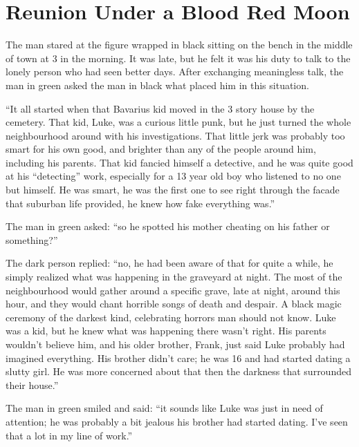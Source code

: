 \chapter{Reunion Under a Blood Red Moon}



The man stared at the figure wrapped in black sitting on the bench
in the middle of town at 3 in the morning. It was late, but he felt
it was his duty to talk to the lonely person who had seen better
days. After exchanging meaningless talk, the man in green asked the
man in black what placed him in this situation.

``It all started when that Bavarius kid moved in the 3 story
house by the cemetery. That kid, Luke, was a curious little punk,
but he just turned the whole neighbourhood around with his
investigations. That little jerk was probably too smart for his own
good, and brighter than any of the people around him, including his
parents. That kid fancied himself a detective, and he was quite
good at his ``detecting'' work, especially for a 13 year
old boy who listened to no one but himself. He was smart, he was
the first one to see right through the facade that suburban life
provided, he knew how fake everything was.''

The man in green asked: ``so he spotted his mother cheating on
his father or something?''

The dark person replied: ``no, he had been aware of that for
quite a while, he simply realized what was happening in the
graveyard at night. The most of the neighbourhood would gather
around a specific grave, late at night, around this hour, and they
would chant horrible songs of death and despair. A black magic
ceremony of the darkest kind, celebrating horrors man should not
know. Luke was a kid, but he knew what was happening there
wasn't right. His parents wouldn't believe him, and his
older brother, Frank, just said Luke probably had imagined
everything. His brother didn't care; he was 16 and had
started dating a slutty girl. He was more concerned about that then
the darkness that surrounded their house.''

The man in green smiled and said: ``it sounds like Luke was
just in need of attention; he was probably a bit jealous his
brother had started dating. I've seen that a lot in my line
of work.''

